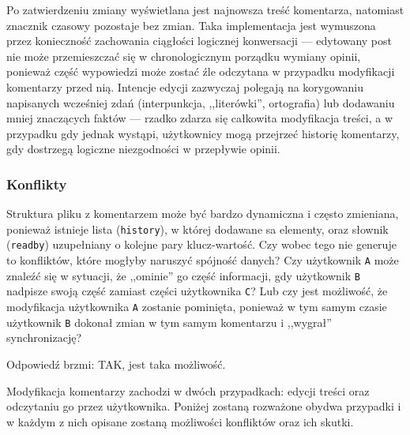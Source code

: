 \documentclass[polish,a4paper,twoside]{ppfcmthesis}
\begin{document}
Po zatwierdzeniu zmiany wyświetlana jest najnowsza treść komentarza, natomiast znacznik czasowy pozostaje bez zmian. Taka implementacja jest wymuszona przez konieczność zachowania ciągłości logicznej konwersacji --- edytowany post nie może przemieszczać się w chronologicznym porządku wymiany opinii, ponieważ część wypowiedzi może zostać źle odczytana w przypadku modyfikacji komentarzy przed nią. Intencje edycji zazwyczaj polegają na korygowaniu napisanych wcześniej zdań (interpunkcja, ,,literówki'', ortografia) lub dodawaniu mniej znaczących faktów --- rzadko zdarza się całkowita modyfikacja treści, a w przypadku gdy jednak wystąpi, użytkownicy mogą przejrzeć historię komentarzy, gdy dostrzegą logiczne niezgodności w przepływie opinii.

\subsubsection*{Konflikty}

Struktura pliku z komentarzem może być bardzo dynamiczna i często zmieniana, ponieważ istnieje lista (\texttt{history}), w której dodawane sa elementy, oraz słownik (\texttt{readby}) uzupełniany o kolejne pary klucz-wartość. Czy wobec tego nie generuje to konfliktów, które mogłyby naruszyć spójność danych? Czy użytkownik \texttt{A} może znaleźć się w sytuacji, że ,,ominie'' go część informacji, gdy użytkownik \texttt{B} nadpisze swoją część zamiast części użytkownika \texttt{C}? Lub czy jest możliwość, że modyfikacja użytkownika \texttt{A} zostanie pominięta, ponieważ w tym samym czasie użytkownik \texttt{B} dokonał zmian w tym samym komentarzu i ,,wygrał'' synchronizację?

Odpowiedź brzmi: TAK, jest taka możliwość.

Modyfikacja komentarzy zachodzi w dwóch przypadkach: edycji treści oraz odczytaniu go przez użytkownika. Poniżej zostaną rozważone obydwa przypadki i w każdym z nich opisane zostaną możliwości konfliktów oraz ich skutki.
\end{document}
